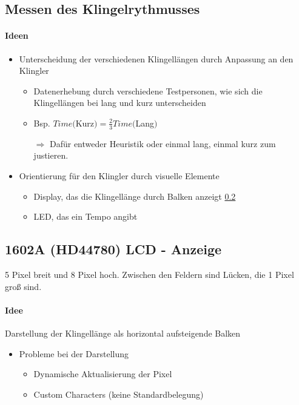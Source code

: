 \documentclass{scrartcl}
\begin{document}

\subsection{Messen des Klingelrythmusses}\label{ssec:mess}

\paragraph{Ideen}
\begin{itemize}
\item Unterscheidung der verschiedenen Klingellängen durch Anpassung an den Klingler
\begin{itemize}
\item Datenerhebung durch verschiedene Testpersonen, wie sich die Klingellängen bei lang und kurz unterscheiden
\item Bsp. $Time($Kurz$) = \frac{2}{3} Time($Lang$)$
\item[$\Rightarrow$] Dafür entweder Heuristik oder einmal lang, einmal kurz zum justieren.
\end{itemize}
\item Orientierung für den Klingler durch visuelle Elemente
\begin{itemize}
\item Display, das die Klingellänge durch Balken anzeigt \ref{ssec:lcd}
\item LED, das ein Tempo angibt
\end{itemize}
\end{itemize}



\subsection{1602A (HD44780) LCD - Anzeige}\label{ssec:lcd} 


5 Pixel breit und 8 Pixel hoch. Zwischen den Feldern sind Lücken, die 1 Pixel groß sind.
\paragraph{Idee} Darstellung der Klingellänge als horizontal aufsteigende Balken
\begin{itemize}
\item Probleme bei der Darstellung
\begin{itemize}
\item Dynamische Aktualisierung der Pixel
\item Custom Characters (keine Standardbelegung)
\end{itemize}
\end{itemize}


%
%
\end{document}
